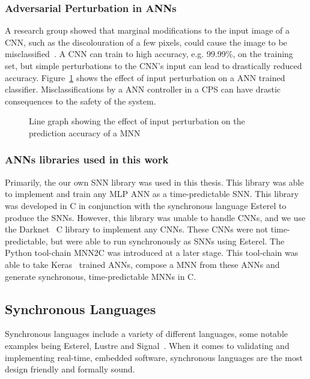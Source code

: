\subsubsection{Adversarial Perturbation in \acfp{ANN}}
A research group showed that marginal modifications to the input image of a \acf{CNN}, such as the discolouration of a few pixels, could cause the image to be misclassified~\cite{Gehr2018AI2SA, ann-pert}.
A \ac{CNN} can train to high accuracy, e.g. 99.99\%, on the training set, but simple perturbations to the \ac{CNN}'s input can lead to drastically reduced accuracy.
Figure~\ref{fig:sign-graph-acc} shows the effect of input perturbation on a \ac{ANN} trained classifier.
Misclassifications by a \ac{ANN} controller in a \ac{CPS} can have drastic consequences to the safety of the system.

\begin{figure}[h]
	\centering
	\scalebox{0.9}{}
	\caption{Line graph showing the effect of input perturbation on the prediction accuracy of a \ac{MNN} \label{fig:sign-graph-acc}}
\end{figure}

\subsubsection{\acfp{ANN} libraries used in this work}
Primarily, the our own \ac{SNN} library was used in this thesis.
This library was able to implement and train any \ac{MLP} \ac{ANN} as a time-predictable \ac{SNN}.
This library was developed in C in conjunction with the synchronous language Esterel to produce the \acp{SNN}.
However, this library was unable to handle \acp{CNN}, and we use the Darknet~\cite{darknet13} C library to implement any \acp{CNN}.
These \acp{CNN} were not time-predictable, but were able to run synchronously as \acp{SNN} using Esterel.
The Python tool-chain \acf{MNN2C} was introduced at a later stage.
This tool-chain was able to take Keras~\cite{chollet2015keras} trained \acp{ANN}, compose a \acf{MNN} from these \acp{ANN} and generate synchronous, time-predictable \acp{MNN} in C.  

\subsection{Synchronous Languages}
Synchronous languages include a variety of different languages, some notable examples being Esterel, Lustre and Signal~\cite{benveniste2003synchronous}.
When it comes to validating and implementing real-time, embedded software, synchronous languages are the most design friendly and formally sound.

